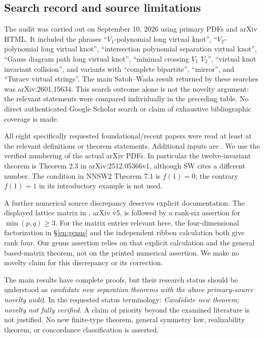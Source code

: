 \documentclass[12pt]{amsart}
\theoremstyle{definition}
\theoremstyle{remark}
\numberwithin{equation}{section}
\begin{document}
\subsection{Search record and source limitations}
The audit was carried out on September 10, 2026 using primary PDFs and
arXiv HTML. It included the phrases ``$V_1$-polynomial long virtual knot'',
``$V_2$-polynomial long virtual knot'', ``intersection polynomial separation
virtual knot'', ``Gauss diagram path long virtual knot'', ``minimal crossing
$V_1$ $V_2$'', ``virtual knot invariant collision'', and variants with
``complete bipartite'', ``mirror'', and ``Turaev virtual strings''.
The main Satoh--Wada result returned by these searches was arXiv:2601.15634.
This search outcome alone is not the novelty argument: the relevant
statements were compared individually in the preceding table.
No direct authenticated Google Scholar search or claim of exhaustive
bibliographic coverage is made.

All eight specifically requested foundational/recent papers were read at
least at the relevant definitions or theorem statements. Additional inputs
are \cite{HNNS,Affine,KR,Turaev}. We use the verified numbering of the
actual arXiv PDFs. In particular the twelve-invariant theorem is
Theorem 2.3 in arXiv:2512.05366v1, although SW cites a different number.
The condition in NNSW2 Theorem 7.1 is $f(1)=0$; the contrary $f(1)=1$
in its introductory example is not used.

A further numerical source discrepancy deserves explicit documentation.
The displayed lattice matrix in \cite[\S4.3(1)]{Turaev}, arXiv v5,
is followed by a rank-six assertion for $\min(p,q)\ge3$.
For the matrix entries relevant here, the four-dimensional factorization
in \S\ref{en:genus} and the independent ribbon calculation both give rank
four. Our genus assertion relies on that explicit calculation and the
general based-matrix theorem, not on the printed numerical assertion.
We make no novelty claim for this discrepancy or its correction.

The main results have complete proofs, but their research status should
be understood as \emph{candidate new separation theorems with the above
primary-source novelty audit}. In the requested status terminology:
\emph{Candidate new theorem; novelty not fully verified.}
A claim of priority beyond the examined
literature is not justified. No new finite-type theorem, general symmetry
law, realizability theorem, or concordance classification is asserted.
\end{document}
